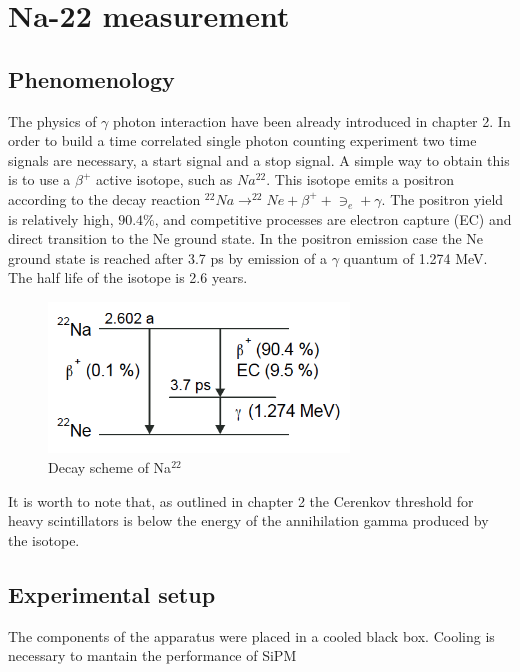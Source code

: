 \chapter{Na-22 measurement}


\section{Phenomenology}

The physics of $\gamma$ photon interaction have been already introduced in chapter 2.
In order to build a time correlated single photon counting experiment two time signals are necessary, a start signal and a stop signal.
A simple way to obtain this is to use a $\beta ^{+}$ active isotope, such as $Na^{22}$. This isotope emits a positron according to the decay reaction $^{22}Na \rightarrow ^{22}Ne + \beta ^{+} + \ni _{e} + \gamma$. The positron yield is relatively high, $90.4\%$, and competitive processes are electron capture (EC) and direct transition to the Ne ground state. 
In the positron emission case the Ne ground state is reached after 3.7 ps by emission of a $\gamma$ quantum of 1.274 MeV. The half life of the isotope is 2.6 years.
\begin{figure}[htbp]
\begin{center}
\includegraphics[width=8cm]{../Pictures/Chapter_7/Na-22}
\end{center}
\caption[Na$^{22}$ decay scheme]{Decay scheme of Na$^{22}$}
\label{fig:Na_22}
\end{figure}
It is worth to note that, as outlined in chapter 2 the Cerenkov threshold for heavy scintillators is below the energy of the annihilation gamma produced by the isotope.


\section{Experimental setup}
The components of the apparatus were placed in a cooled black box.
Cooling is necessary to mantain the performance of SiPM

